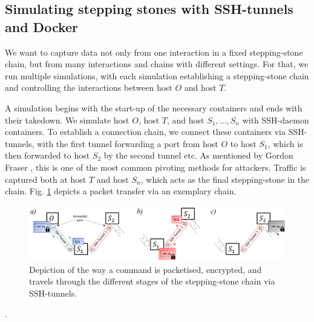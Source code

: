 \documentclass[runningheads,11pt]{llncs}\usepackage[]{graphicx}\usepackage[]{color}
\begin{document}
\subsection{Simulating stepping stones with SSH-tunnels and Docker}\label{Sec:Setup}

We want to capture data not only from one interaction in a fixed stepping-stone chain, but from many interactions and chains with different settings. For that, we run multiple simulations, with each simulation establishing a stepping-stone chain and controlling the interactions between host $O$ and host $T$. %

A simulation begins with the start-up of the necessary containers and ends with their takedown. We simulate host $O$, host $T$, and host $S_1,\dots,S_n$ with SSH-daemon containers. To establish a connection chain, we connect these containers via SSH-tunnels, with the first tunnel forwarding a port from host $O$ to host $S_1$, which is then forwarded to host $S_2$ by the second tunnel etc. As mentioned by Gordon Fraser \cite{pivoting2015}, this is one of the most common pivoting methods for attackers. Traffic is captured both at host $T$ and host $S_n$, which acts as the final stepping-stone in the chain.
Fig. \ref{Fig:Packetway} depicts a packet transfer via an exemplary chain. 


\begin{figure}
\centering
\includegraphics[width=1\textwidth]{images/Packetway_2.png}
\caption{Depiction of the way a command is packetised, encrypted, and travels through the different stages of the stepping-stone chain via SSH-tunnels.}\label{Fig:Packetway}
\end{figure}

.%







\end{document}
